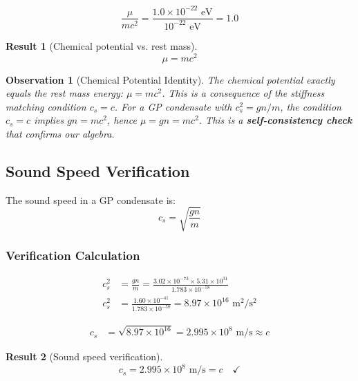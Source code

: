 \documentclass[11pt,a4paper]{article}
\newcommand{\ee}[1]{\times 10^{#1}}
\newtheorem{result}{Result}
\newtheorem{observation}{Observation}
\begin{document}
\begin{equation}
\frac{\mu}{mc^2} = \frac{1.0 \ee{-22} \text{ eV}}{10^{-22} \text{ eV}} = 1.0
\end{equation}

\begin{result}[Chemical potential vs. rest mass]
\begin{equation}
\boxed{\mu = mc^2}
\end{equation}
\end{result}

\begin{observation}[Chemical Potential Identity]
The chemical potential exactly equals the rest mass energy: $\mu = mc^2$. This is a consequence of the stiffness matching condition $c_s = c$. For a GP condensate with $c_s^2 = gn/m$, the condition $c_s = c$ implies $gn = mc^2$, hence $\mu = gn = mc^2$. This is a \textbf{self-consistency check} that confirms our algebra.
\end{observation}

\subsection{Sound Speed Verification}
\label{sec:sound_speed}

The sound speed in a GP condensate is:
\begin{equation}
c_s = \sqrt{\frac{gn}{m}}
\end{equation}

\subsubsection{Verification Calculation}

\begin{align}
c_s^2 &= \frac{gn}{m} = \frac{3.02 \ee{-73} \times 5.31 \ee{31}}{1.783 \ee{-58}} \nonumber \\
c_s^2 &= \frac{1.60 \ee{-41}}{1.783 \ee{-58}} = 8.97 \ee{16} \text{ m}^2/\text{s}^2
\end{align}

\begin{align}
c_s &= \sqrt{8.97 \ee{16}} = 2.995 \ee{8} \text{ m/s} \approx c
\end{align}

\begin{result}[Sound speed verification]
\begin{equation}
\boxed{c_s = 2.995 \times 10^8 \text{ m/s} = c \quad \checkmark}
\end{equation}
\end{result}
\end{document}

